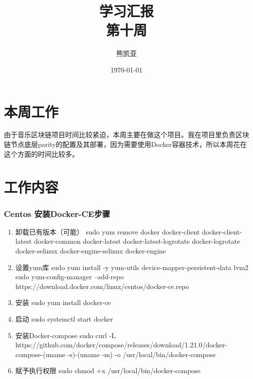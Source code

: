\documentclass[a4paper]{article}
\title{学习汇报\\第十周}
\author{熊凯亚}
\date{\today}
\begin{document}
\maketitle

\section{本周工作}
由于音乐区块链项目时间比较紧迫，本周主要在做这个项目。我在项目里负责区块链节点底层parity的配置及其部署，因为需要使用Docker容器技术，所以本周花在这个方面的时间比较多。
\section{工作内容}
\subsubsection*{Centos 安装Docker-CE步骤}
\begin{enumerate}
\item 卸载已有版本（可能）
sudo yum remove docker docker-client docker-client-latest docker-common docker-latest docker-latest-logrotate docker-logrotate docker-selinux docker-engine-selinux docker-engine

\item 设置yum库 
sudo yum install -y yum-utils device-mapper-persistent-data lvm2
sudo yum-config-manager  --add-repo https://download.docker.com/linux/centos/docker-ce.repo

\item 安装 
sudo yum install docker-ce

\item 启动 
sudo systemctl start docker 

\item 安装Docker-compose
sudo curl -L https://github.com/docker/compose/releases/download/1.21.0/docker-compose-(uname -s)-(uname -m) -o /usr/local/bin/docker-compose

\item 赋予执行权限 
sudo chmod +x /usr/local/bin/docker-compose
\end{enumerate}
\end{document}
